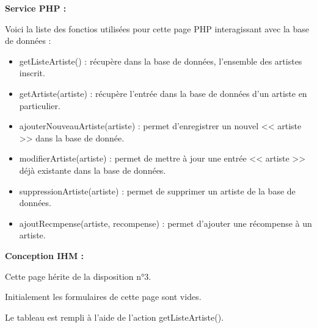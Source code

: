 			\begin{paragraphe}
				\textbf{Service PHP :}
			\end{paragraphe}

			\begin{paragraphe}
				Voici la liste des fonctios utilisées pour cette page PHP interagissant avec la base de données :
			\end{paragraphe}

			\begin{paragraphe}
				\begin{itemize}
					\item getListeArtiste() : récupère dans la base de données, l'ensemble des artistes inscrit.
					\item getArtiste(artiste) : récupère l'entrée dans la base de données d'un artiste en particulier.
				\end{itemize}
			\end{paragraphe}

			\begin{paragraphe}
				\begin{itemize}
					\item ajouterNouveauArtiste(artiste) : permet d'enregistrer un nouvel << artiste >> dans la base de donnée.
					\item modifierArtiste(artiste) : permet de mettre à jour une entrée << artiste >> déjà existante dans la base de données.
					\item suppressionArtiste(artiste) : permet de supprimer un artiste de la base de données.
					\item ajoutRecmpense(artiste, recompense) : permet d'ajouter une récompense à un artiste. 
				\end{itemize}
			\end{paragraphe}

			\begin{paragraphe}
				\textbf{Conception IHM :}
			\end{paragraphe}

			\begin{paragraphe}
				Cette page hérite de la disposition n°3. \par
				Initialement les formulaires de cette page sont vides.\par
				Le tableau est rempli à l'aide de l'action getListeArtiste().
			\end{paragraphe}



